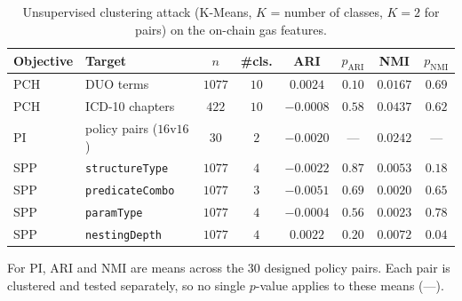 \begin{table}[htbp]
	\centering
	\caption{Unsupervised clustering attack (K-Means, $K$ = number of classes, $K=2$ for
		pairs) on the on-chain gas features.}
	\label{tab:clustering-summary}
	\footnotesize
	\setlength{\tabcolsep}{4pt}
	\begin{tabular}{@{}llcccccc@{}}
		\toprule
		Objective & Target                   & $n$    & \#cls. & ARI       & $p_{\mathrm{ARI}}$ & NMI      & $p_{\mathrm{NMI}}$ \\
		\midrule
		PCH       & DUO terms                & $1077$ & $10$   & $0.0024$  & $0.10$             & $0.0167$ & $0.69$             \\
		PCH       & ICD-10 chapters          & $422$  & $10$   & $-0.0008$ & $0.58$             & $0.0437$ & $0.62$             \\
		PI        & policy pairs ($16$v$16$) & $30$   & $2$    & $-0.0020$ & ---                & $0.0242$ & ---                \\
		SPP       & \texttt{structureType}   & $1077$ & $4$    & $-0.0022$ & $0.87$             & $0.0053$ & $0.18$             \\
		SPP       & \texttt{predicateCombo}  & $1077$ & $3$    & $-0.0051$ & $0.69$             & $0.0020$ & $0.65$             \\
		SPP       & \texttt{paramType}       & $1077$ & $4$    & $-0.0004$ & $0.56$             & $0.0023$ & $0.78$             \\
		SPP       & \texttt{nestingDepth}    & $1077$ & $4$    & $0.0022$  & $0.20$             & $0.0072$ & $0.04$             \\
		\bottomrule
	\end{tabular}

	\begin{tablenote}
		For PI, ARI and NMI are means across the $30$ designed policy pairs.
		Each pair is clustered and tested separately, so no single $p$-value applies to these means (---).
	\end{tablenote}
\end{table}
